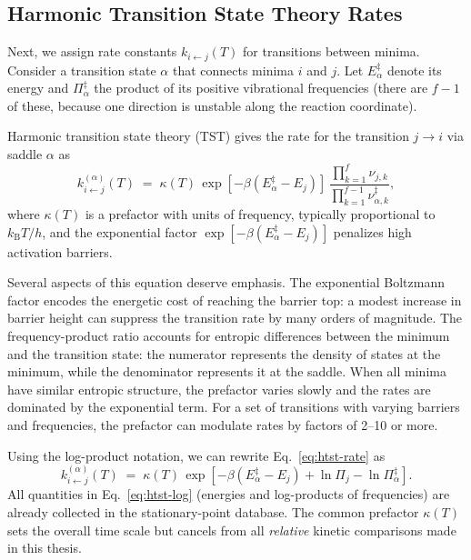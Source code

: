 \subsection{Harmonic Transition State Theory Rates}\label{subsec:htst}

Next, we assign rate constants $k_{i\leftarrow j}(T)$ for transitions
between minima. Consider a transition state $\alpha$ that connects
minima $i$ and $j$. Let $E_\alpha^\ddagger$ denote its energy and
$\Pi_\alpha^\ddagger$ the product of its positive vibrational frequencies
(there are $f-1$ of these, because one direction is unstable along the
reaction coordinate).

Harmonic transition state theory (TST) gives the rate for the transition
$j \to i$ via saddle $\alpha$ as
\begin{equation}\label{eq:htst-rate}
  k^{(\alpha)}_{i\leftarrow j}(T)
  \;=\;
  \kappa(T)\,
  \exp\!\left[-\beta\left(E^\ddagger_\alpha - E_j\right)\right]\,
  \frac{\displaystyle \prod_{k=1}^{f} \nu_{j,k}}
       {\displaystyle \prod_{k=1}^{f-1} \nu^\ddagger_{\alpha,k}},
\end{equation}
where $\kappa(T)$ is a prefactor with units of frequency, typically proportional
to $k_{\mathrm{B}}T/h$, and the exponential factor
$\exp[-\beta(E^\ddagger_\alpha - E_j)]$ penalizes high activation barriers.

Several aspects of this equation deserve emphasis. The exponential Boltzmann factor
encodes the energetic cost of reaching the barrier top: a modest increase in barrier
height can suppress the transition rate by many orders of magnitude. The frequency-product
ratio accounts for entropic differences between the minimum and the transition state:
the numerator represents the density of states at the minimum, while the denominator
represents it at the saddle. When all minima have similar entropic structure, the
prefactor varies slowly and the rates are dominated by the exponential term. For a
set of transitions with varying barriers and frequencies, the prefactor can modulate
rates by factors of 2--10 or more.

Using the log-product notation, we can rewrite Eq.~\eqref{eq:htst-rate} as
\begin{equation}\label{eq:htst-log}
  k^{(\alpha)}_{i\leftarrow j}(T)
  \;=\;
  \kappa(T)\,
  \exp\!\left[
      -\beta\left(E^\ddagger_\alpha - E_j\right)
      + \ln \Pi_j - \ln \Pi^\ddagger_\alpha
  \right].
\end{equation}
All quantities in Eq.~\eqref{eq:htst-log} (energies and log-products of
frequencies) are already collected in the stationary-point database. The common
prefactor $\kappa(T)$ sets the overall time scale but cancels from all
\emph{relative} kinetic comparisons made in this thesis.


